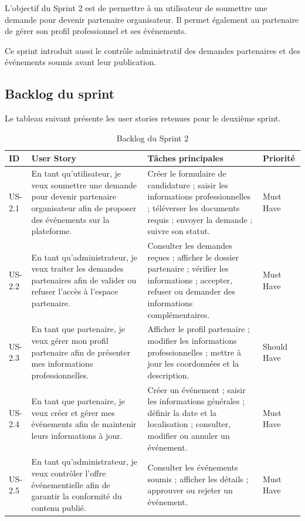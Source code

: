 L’objectif du Sprint 2 est de permettre à un utilisateur de soumettre une demande pour devenir partenaire organisateur. Il permet également au partenaire de gérer son profil professionnel et ses événements.


Ce sprint introduit aussi le contrôle administratif des demandes partenaires et des événements soumis avant leur publication.


\subsection{Backlog du sprint}


Le tableau suivant présente les user stories retenues pour le deuxième sprint.


\begin{table}[H]
\centering
\caption{Backlog du Sprint 2}
\label{tableau:4-1}
\renewcommand{\arraystretch}{1.2}
\begin{tabularx}{\textwidth}{|>{\raggedright\arraybackslash}X|>{\raggedright\arraybackslash}X|>{\raggedright\arraybackslash}X|>{\raggedright\arraybackslash}X|}
\hline
\rowcolor[HTML]{ECF4FF}
\textbf{ID} & \textbf{User Story} & \textbf{Tâches principales} & \textbf{Priorité} \\
\hline
US-2.1 & En tant qu’utilisateur, je veux soumettre une demande pour devenir partenaire organisateur afin de proposer des événements sur la plateforme. & Créer le formulaire de candidature ; saisir les informations professionnelles ; téléverser les documents requis ; envoyer la demande ; suivre son statut. & Must Have \\
\hline
US-2.2 & En tant qu’administrateur, je veux traiter les demandes partenaires afin de valider ou refuser l’accès à l’espace partenaire. & Consulter les demandes reçues ; afficher le dossier partenaire ; vérifier les informations ; accepter, refuser ou demander des informations complémentaires. & Must Have \\
\hline
US-2.3 & En tant que partenaire, je veux gérer mon profil partenaire afin de présenter mes informations professionnelles. & Afficher le profil partenaire ; modifier les informations professionnelles ; mettre à jour les coordonnées et la description. & Should Have \\
\hline
US-2.4 & En tant que partenaire, je veux créer et gérer mes événements afin de maintenir leurs informations à jour. & Créer un événement ; saisir les informations générales ; définir la date et la localisation ; consulter, modifier ou annuler un événement. & Must Have \\
\hline
US-2.5 & En tant qu’administrateur, je veux contrôler l’offre événementielle afin de garantir la conformité du contenu publié. & Consulter les événements soumis ; afficher les détails ; approuver ou rejeter un événement. & Must Have \\
\hline
\end{tabularx}
\end{table}


